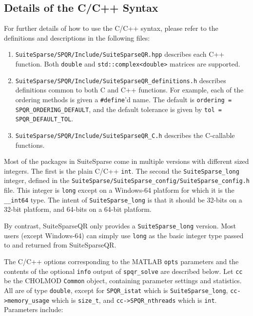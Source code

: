 \documentclass[12pt]{article}
\begin{document}
\subsection{Details of the C/C++ Syntax}

For further details of how to use the C/C++ syntax, please refer to the
definitions and descriptions in the following files:

\begin{enumerate}
\item \verb'SuiteSparse/SPQR/Include/SuiteSparseQR.hpp' describes each
C++ function.  Both \verb'double' and \verb'std::complex<double>' matrices
are supported.

\item \verb'SuiteSparse/SPQR/Include/SuiteSparseQR_definitions.h' describes
definitions \newline common to both C and C++ functions.  For example, each of
the ordering methods is given a \verb'#define''d name.  The default is
\verb'ordering = SPQR_ORDERING_DEFAULT', and the default tolerance is given by
\verb'tol = SPQR_DEFAULT_TOL'.

\item \verb'SuiteSparse/SPQR/Include/SuiteSparseQR_C.h' describes
the C-callable functions.

\end{enumerate}

Most of the packages in SuiteSparse come in multiple versions with different
sized integers.  The first is the plain C/C++ \verb'int'.  The second the
\verb'SuiteSparse_long' integer, defined in the
\verb'SuiteSparse/SuiteSparse_config/SuiteSparse_config.h'
file.  This integer is \verb'long' except on a Windows-64 platform for which it
is the  \verb'__int64' type.  The intent of \verb'SuiteSparse_long'
is that it should be
32-bits on a 32-bit platform, and 64-bits on a 64-bit platform.  

By contrast, SuiteSparseQR only provides a \verb'SuiteSparse_long' version.
Most users (except Windows-64) can simply use \verb'long' as the basic integer
type passed to and returned from SuiteSparseQR.

The C/C++ options corresponding to the MATLAB \verb'opts' parameters and the
contents of the optional \verb'info' output of \verb'spqr_solve' are described
below.  Let \verb'cc' be the CHOLMOD \verb'Common' object, containing parameter
settings and statistics.  All are of type \verb'double', except for
\verb'SPQR_istat' which is \verb'SuiteSparse_long',
\verb'cc->memory_usage' which is
\verb'size_t', and \verb'cc->SPQR_nthreads' which is \verb'int'.  Parameters
include:
\end{document}
